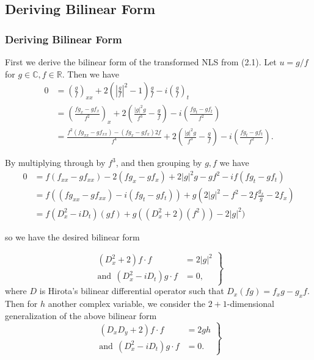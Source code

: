 \documentclass{beamer}
\def\e{\end}
\def\CC{\mathbb{C}}
\def\f{\frac}
\def\RR{\mathbb{R}}
\theoremstyle{plain}
\theoremstyle{definition}
\begin{document}

%
%


\subsection{Deriving Bilinear Form}
\frame 
{
\frametitle{Deriving Bilinear Form}
First we derive the bilinear form of the transformed NLS from (2.1). Let $u=g/f$ for $g\in \CC, f\in \RR$. Then we have
\begin{align*} 0 & = \left ( \f{g}{f} \right ) _{xx} + 2 \left ( \left | \f{g}{f} \right | ^2 - 1 \right ) \f{g}{f} - i \left ( \f{g}{f} \right ) _t \\
& = \left ( \f{fg_x -gf_x }{f^2} \right ) _x + 2 \left ( \f{|g|^2g}{f^3} -\f{g}{f} \right ) - i \left ( \f{fg_t-gf_t}{f^2} \right ) \\
& = \f{f^2(fg_{xx}-gf_{xx}) - (fg_x -gf_x)2f}{f^4} + 2 \left ( \f{|g|^2g}{f^3} -\f{g}{f} \right )- i \left ( \f{fg_t-gf_t}{f^2} \right ). \end{align*}
}

\frame
{
By multiplying through by $f^3$, and then grouping by $g,f$ we have
\begin{align*} 0 & = f(f_{xx}-gf_{xx}) - 2 (fg_x -gf_x) + 2 |g|^2 g - gf^2 -if(fg_t-gf_t)\\&= f((fg_{xx} -gf_{xx} ) -i (fg_t -gf_t) ) + g\left ( 2|g|^2 -f^2-2f\f{g_x}{g} -2f_x \right ) \\
& = f(D_x^2 -iD_t)(gf) + g((D_x^2 +2)(f^2)) - 2|g|^2)
\end{align*}
}

\frame
{
so we have the desired bilinear form 

\begin{equation*}\tag{3.1}
 \left. \begin{array}{rl} (D_x ^2 + 2) f\cdot f & = 2|g|^2 \\ \text{and} ~~ (D_x^2 - iD_t) g\cdot f & = 0, \end{array} \right \}
 \e{equation*} 
where $D$ is Hirota's bilinear differential operator such that $D_x (fg) = f_xg - g_xf.$
Then for $h$ another complex variable, we consider the $2+1$-dimensional generalization of the above bilinear form 
\begin{equation*}\tag{3.2}
 \left. \begin{array}{rl} (D_x D_y + 2) f\cdot f&= 2gh \\ \text{and} ~~ (D_x^2 - iD_t) g\cdot f&= 0. \end{array} \right \}
 \e{equation*} 
}
\end{document}
